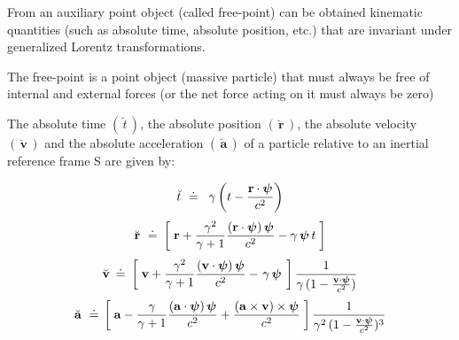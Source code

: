 \documentclass[10pt,fleqn]{article}
\begin{document}
\noindent From an auxiliary point object (called free-point) can be obtained kinematic quantities (such as absolute time, absolute position, etc.) that are invariant under generalized Lorentz transformations.
\par \bigskip \smallskip
\noindent The free-point is a point object (massive particle) that must always be free of internal and external forces (or the net force acting on it must always be zero)
\par \bigskip \smallskip
\noindent The absolute time $( \, \breve{t} \, )$, the absolute position $( \, \breve{\mathbf{r}} \, )$, the absolute velocity $( \, \breve{\mathbf{v}} \, )$ and the absolute acceleration $( \, \breve{\mathbf{a}} \, )$ of a particle relative to an inertial reference frame S are given by:
\par \vspace{+0.21em}
\begin{eqnarray*}
\breve{t} ~\doteq~ \hspace{+0.24em} \gamma \left ( t - \frac{\mathbf{r} \cdot \boldsymbol{\psi}}{c^2} \right )
\end{eqnarray*}
\vspace{-0.45em}
\begin{eqnarray*}
\breve{\mathbf{r}} ~\doteq~ \hspace{-0.09em} \left [ \; \mathbf{r} + \frac{\gamma^2}{\gamma + 1} \frac{( \mathbf{r} \cdot \boldsymbol{\psi} ) \, \boldsymbol{\psi}}{c^2} - \gamma \, \boldsymbol{\psi} \, t \; \right ]
\end{eqnarray*}
\vspace{-0.30em}
\begin{eqnarray*}
\breve{\mathbf{v}} \hspace{-0.12em} ~\doteq~ \hspace{-0.12em} \left [ \; \mathbf{v} + \frac{\gamma^2}{\gamma + 1} \frac{( \mathbf{v} \cdot \boldsymbol{\psi} ) \, \boldsymbol{\psi}}{c^2} - \hspace{+0.114em} \gamma \, \boldsymbol{\psi} \hspace{+0.114em} \; \right ] \frac{1}{\gamma \, ( 1 - \frac{\mathbf{v} \cdot \boldsymbol{\psi}}{c^2} )}
\end{eqnarray*}
\vspace{-0.30em}
\begin{eqnarray*}
\breve{\mathbf{a}} ~\doteq~ \hspace{-0.18em} \left [ \; \mathbf{a} - \frac{\gamma}{\gamma + 1} \frac{( \mathbf{a} \cdot \boldsymbol{\psi} ) \, \boldsymbol{\psi}}{c^2} + \frac{( \mathbf{a} \times \mathbf{v} ) \times \boldsymbol{\psi}}{c^2} \; \right ] \frac{1}{\gamma^2 \, ( 1 - \frac{\mathbf{v} \cdot \boldsymbol{\psi}}{c^2} )^3}
\end{eqnarray*}
\end{document}
